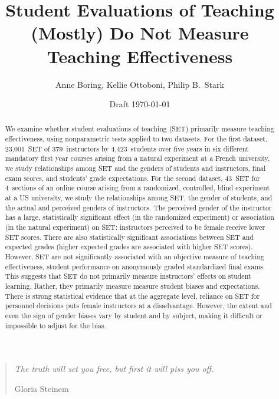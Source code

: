 \documentclass[12pt]{article}
\title{Student Evaluations of Teaching (Mostly) Do Not Measure Teaching Effectiveness}
\author{Anne Boring, Kellie Ottoboni, Philip B.~Stark}
\date{Draft \today}
\begin{document}
\maketitle

\newpage
\begin{quotation}
    \emph{The truth will set you free, but first it will piss you off.}
    
     \hfill Gloria Steinem

\begin{abstract}

We examine whether student evaluations of teaching (SET) 
primarily measure teaching effectiveness, using nonparametric tests applied
to two datasets. 
For the first dataset, 23,001~SET of 379~instructors by 4,423~students over five years in six different mandatory first year courses arising from a natural experiment at a French university, 
we study relationships among SET and the genders of students and instructors, final exam scores, and students' grade expectations. 
For the second dataset, 43~SET for 4~sections of an online course arising from a randomized, controlled, 
blind experiment at a US university, 
we study the relationships among SET, the gender of students, and the actual and perceived genders of instructors. 
The perceived gender of the instructor has a large, statistically significant effect 
(in the randomized experiment)
or association (in the natural experiment) on 
SET: instructors perceived to be female receive lower SET scores.
There are also statistically significant associations between SET and expected grades 
(higher expected grades are associated with higher SET scores). 
However, SET are not significantly associated with an objective measure of teaching effectiveness,
student performance on anonymously graded standardized final exams. 
This suggests that SET do not primarily measure instructors' 
effects on student learning. 
Rather, they primarily measure measure student biases and expectations.
There is strong statistical evidence that at the aggregate level, reliance on SET for 
personnel decisions puts female instructors at a disadvantage.
However, the extent and even the sign of gender biases vary by student and by subject, making it 
difficult or impossible to adjust for the bias. 


\end{abstract}
\end{quotation}
\end{document}
